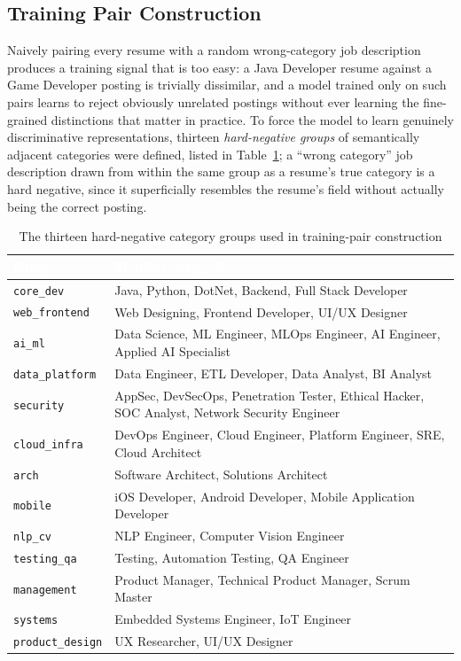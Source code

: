 \documentclass[11pt,a4paper]{article}
\newcommand{\hdrow}{\rowcolor{TPnavy}}
\newcommand{\hdtxt}[1]{\textcolor{white}{\bfseries #1}}
\newcommand{\code}[1]{\texttt{\footnotesize #1}}
\begin{document}
\subsection{Training Pair Construction}
\label{sec:mod1-pairs}

Naively pairing every resume with a random wrong-category job description produces a training signal that is too easy: a Java Developer resume against a Game Developer posting is trivially dissimilar, and a model trained only on such pairs learns to reject obviously unrelated postings without ever learning the fine-grained distinctions that matter in practice. To force the model to learn genuinely discriminative representations, thirteen \emph{hard-negative groups} of semantically adjacent categories were defined, listed in Table~\ref{tab:mod1-hardneg}; a ``wrong category'' job description drawn from within the same group as a resume's true category is a hard negative, since it superficially resembles the resume's field without actually being the correct posting.

\begin{table}[H]
\centering
\caption{The thirteen hard-negative category groups used in training-pair construction}
\label{tab:mod1-hardneg}
\small
\begin{tabular}{p{2.9cm}p{10.7cm}}
\toprule
\hdrow \hdtxt{Group} & \hdtxt{Member categories} \\
\midrule
\code{core\_dev} & Java, Python, DotNet, Backend, Full Stack Developer \\
\rowcolor{TPlight}
\code{web\_frontend} & Web Designing, Frontend Developer, UI/UX Designer \\
\code{ai\_ml} & Data Science, ML Engineer, MLOps Engineer, AI Engineer, Applied AI Specialist \\
\rowcolor{TPlight}
\code{data\_platform} & Data Engineer, ETL Developer, Data Analyst, BI Analyst \\
\code{security} & AppSec, DevSecOps, Penetration Tester, Ethical Hacker, SOC Analyst, Network Security Engineer \\
\rowcolor{TPlight}
\code{cloud\_infra} & DevOps Engineer, Cloud Engineer, Platform Engineer, SRE, Cloud Architect \\
\code{arch} & Software Architect, Solutions Architect \\
\rowcolor{TPlight}
\code{mobile} & iOS Developer, Android Developer, Mobile Application Developer \\
\code{nlp\_cv} & NLP Engineer, Computer Vision Engineer \\
\rowcolor{TPlight}
\code{testing\_qa} & Testing, Automation Testing, QA Engineer \\
\code{management} & Product Manager, Technical Product Manager, Scrum Master \\
\rowcolor{TPlight}
\code{systems} & Embedded Systems Engineer, IoT Engineer \\
\code{product\_design} & UX Researcher, UI/UX Designer \\
\bottomrule
\end{tabular}
\end{table}
\end{document}
